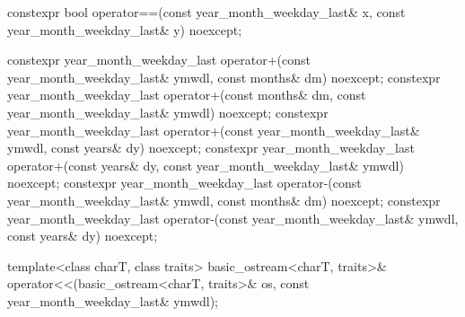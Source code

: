\begin{codeblock}
{  constexpr bool operator==(const year_month_weekday_last& x,
                            const year_month_weekday_last& y) noexcept;

  constexpr year_month_weekday_last
    operator+(const year_month_weekday_last& ymwdl, const months& dm) noexcept;
  constexpr year_month_weekday_last
    operator+(const months& dm, const year_month_weekday_last& ymwdl) noexcept;
  constexpr year_month_weekday_last
    operator+(const year_month_weekday_last& ymwdl, const years& dy) noexcept;
  constexpr year_month_weekday_last
    operator+(const years& dy, const year_month_weekday_last& ymwdl) noexcept;
  constexpr year_month_weekday_last
    operator-(const year_month_weekday_last& ymwdl, const months& dm) noexcept;
  constexpr year_month_weekday_last
    operator-(const year_month_weekday_last& ymwdl, const years& dy) noexcept;

  template<class charT, class traits>
    basic_ostream<charT, traits>&
      operator<<(basic_ostream<charT, traits>& os, const year_month_weekday_last& ymwdl);

}
\end{codeblock}
